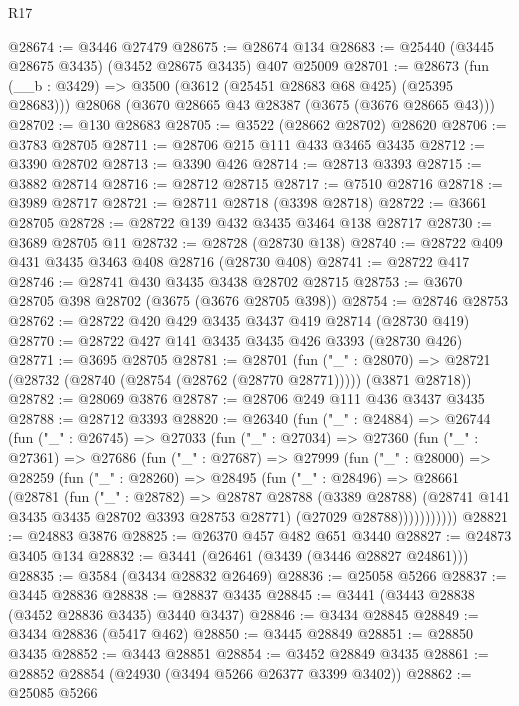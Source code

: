 \begin{lexlean}{R17}
\begin{coremodule}
@28674 := @3446 @27479
@28675 := @28674 @134
@28683 := @25440 (@3445 @28675 @3435) (@3452 @28675 @3435) @407 @25009
@28701 := @28673
    (fun (__b : @3429) => @3500 (@3612 (@25451 @28683 @68 @425) (@25395 @28683)))
    @28068
    (@3670 @28665 @43 @28387 (@3675 (@3676 @28665 @43)))
@28702 := @130 @28683
@28705 := @3522 (@28662 @28702) @28620
@28706 := @3783 @28705
@28711 := @28706 @215 @111 @433 @3465 @3435
@28712 := @3390 @28702
@28713 := @3390 @426
@28714 := @28713 @3393
@28715 := @3882 @28714
@28716 := @28712 @28715
@28717 := @7510 @28716
@28718 := @3989 @28717
@28721 := @28711 @28718 (@3398 @28718)
@28722 := @3661 @28705
@28728 := @28722 @139 @432 @3435 @3464 @138 @28717
@28730 := @3689 @28705 @11
@28732 := @28728 (@28730 @138)
@28740 := @28722 @409 @431 @3435 @3463 @408 @28716 (@28730 @408)
@28741 := @28722 @417
@28746 := @28741 @430 @3435 @3438 @28702 @28715
@28753 := @3670 @28705 @398 @28702 (@3675 (@3676 @28705 @398))
@28754 := @28746 @28753
@28762 := @28722 @420 @429 @3435 @3437 @419 @28714 (@28730 @419)
@28770 := @28722 @427 @141 @3435 @3435 @426 @3393 (@28730 @426)
@28771 := @3695 @28705
@28781 := @28701
    (fun ("_" : @28070) =>
    @28721 (@28732 (@28740 (@28754 (@28762 (@28770 @28771))))) (@3871 @28718))
@28782 := @28069 @3876
@28787 := @28706 @249 @111 @436 @3437 @3435
@28788 := @28712 @3393
@28820 := @26340
    (fun ("_" : @24884) =>
    @26744
      (fun ("_" : @26745) =>
      @27033
        (fun ("_" : @27034) =>
        @27360
          (fun ("_" : @27361) =>
          @27686
            (fun ("_" : @27687) =>
            @27999
              (fun ("_" : @28000) =>
              @28259
                (fun ("_" : @28260) =>
                @28495
                  (fun ("_" : @28496) =>
                  @28661
                    (@28781
                      (fun ("_" : @28782) =>
                      @28787
                        @28788
                        (@3389 @28788)
                        (@28741 @141 @3435 @3435 @28702 @3393 @28753 @28771)
                        (@27029 @28788)))))))))))
@28821 := @24883 @3876
@28825 := @26370 @457 @482 @651 @3440
@28827 := @24873 @3405 @134
@28832 := @3441 (@26461 (@3439 (@3446 @28827 @24861)))
@28835 := @3584 (@3434 @28832 @26469)
@28836 := @25058 @5266
@28837 := @3445 @28836
@28838 := @28837 @3435
@28845 := @3441 (@3443 @28838 (@3452 @28836 @3435) @3440 @3437)
@28846 := @3434 @28845
@28849 := @3434 @28836 (@5417 @462)
@28850 := @3445 @28849
@28851 := @28850 @3435
@28852 := @3443 @28851
@28854 := @3452 @28849 @3435
@28861 := @28852 @28854 (@24930 (@3494 @5266 @26377 @3399 @3402))
@28862 := @25085 @5266

\end{coremodule}
\end{lexlean}
